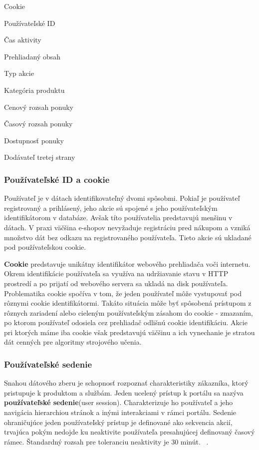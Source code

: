 \begin{my_itemize}
	\item {Cookie}
	\item {Používateľské ID}
	\item {Čas aktivity}
	\item {Prehliadaný obsah}
	\item {Typ akcie}
	\item {Kategória produktu}
	\item {Cenový rozsah ponuky}
	\item {Časový rozsah ponuky}
	\item {Dostupnosť ponuky}
	\item {Dodávateľ tretej strany}
\end{my_itemize}

\subsubsection*{Používateľské ID a cookie} 
Používateľ je v dátach identifikovateľný dvomi spôsobmi. Pokiaľ je používateľ registrovaný a prihlásený, jeho akcie sú spojené s jeho používateľským identifikátorom v databáze. Avšak títo používatelia predstavujú menšinu v dátach. V praxi väčšina e-shopov nevyžaduje registráciu pred nákupom a vzniká množstvo dát bez odkazu na registrovaného používateľa. Tieto akcie sú ukladané pod používateľskou cookie.

\textbf{Cookie} predstavuje unikátny identifikátor webového prehliadača voči internetu. Okrem identifikácie používateľa sa využíva na udržiavanie stavu v HTTP prostredí a po prijatí od webového servera sa ukladá na disk používateľa. Problematika cookie spočíva v tom, že jeden používateľ môže vystupovať pod rôznymi cookie identifikátormi. Takáto situácia môže byť spôsobená prístupom z rôznych zariadení alebo cieleným používateľským zásahom do cookie - zmazaním, po ktorom používateľ odosiela cez prehliadač odlišnú cookie identifikáciu. Akcie pri ktorých máme iba cookie však predstavujú väčšinu a ich vynechanie je stratou dát cenných pre algoritmy strojového učenia.


\subsubsection*{Používateľské sedenie}
\label{session}
Snahou dátového zberu je schopnosť rozpoznať charakteristiky zákazníka, ktorý pristupuje k produktom a službám. Jeden ucelený prístup k portálu sa nazýva \textbf{používateľské sedenie}(user session). Charakterizuje ho používateľ a jeho navigácia hierarchiou stránok a inými interakciami v rámci portálu.  Sedenie ohraničujúce jeden používateľský prístup je definované ako sekvencia akcií, trvajúca pokým nedojde ku neaktivite používateľa presahujúcej definovaný časový rámec. Štandardný rozsah pre toleranciu neaktivity je 30 minút.  ~\cite{zhou2010research}.


